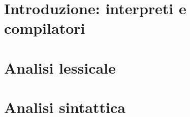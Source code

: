 \documentclass{article}
\begin{document}
\newgeometry{}

\tableofcontents
\restoregeometry

\section{Introduzione: interpreti e compilatori}


\section{Analisi lessicale}


\section{Analisi sintattica}

\end{document}
